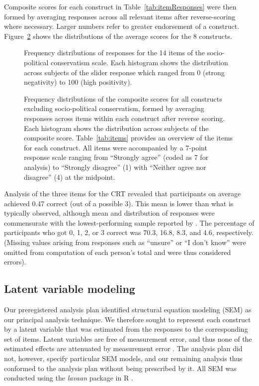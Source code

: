 \documentclass[fignum,man]{apa}\usepackage[]{graphicx}\usepackage[]{color}
\begin{document}
Composite scores for each construct in Table~\ref{tab:itemResponses}
 were then formed by averaging 
responses across
all relevant items after reverse-scoring where necessary. 
Larger numbers refer to greater endorsement of a construct. 
Figure~\ref{fig:histoSocDarw} shows the distributions 
of the average scores for the 8 constructs. 
\begin{figure}[tp] %
	\caption{Frequency distributions of responses for the
		14 items of the socio-political conservatism scale.
		Each histogram shows the distribution
		across subjects of the slider response which
		ranged from 0 (strong negativity) to 100 (high positivity). }
	\label{fig:slidersSocDarw}
\end{figure}

\begin{figure}[tp] %
	\caption{Frequency distributions of the composite scores for all constructs
		excluding socio-political conservatism,
		formed by averaging responses across items within each construct 
		after
		reverse scoring. Each histogram shows the distribution
		across subjects of the composite score. 		
		Table~\ref{tab:items} provides an overview of the items for
		each construct. All items were accompanied by a 7-point 
		response scale ranging 
		from ``Strongly agree'' (coded as 7 for analysis) to
		 ``Strongly disagree'' (1) with ``Neither agree nor disagree'' (4)
		at the midpoint. }
	\label{fig:histoSocDarw}
\end{figure}

Analysis of the three items for the CRT revealed that participants on average
achieved 0.47 correct (out of a possible 3).
This mean is lower than what is typically observed, although
mean and distribution of responses were commensurate with the lowest-performing
sample reported by .
The percentage of participants who got 0, 1, 2, or 3 correct was 
70.3, 16.8, 8.3,
and 4.6, respectively. (Missing values
arising from responses such as ``unsure'' or ``I don't know'' were omitted from computation
of each person's total and were thus considered errors).

\subsection{Latent variable modeling}
Our
preregistered analysis plan identified structural equation modeling (SEM)
as our principal analysis technique. 
We therefore sought to represent each construct by a 
latent variable that was estimated from the 
responses to the corresponding set of items. 
Latent variables are free of measurement error, and thus none of the estimated effects 
are attenuated by measurement error \cite{Coffman05}. 
The analysis plan did not, however, 
specify particular SEM models, and our 
remaining analysis 
thus conformed to the analysis plan without being 
 prescribed by it.
 All SEM was conducted using the \textit{lavaan} package in R \cite{Rosseel12}.
\end{document}
